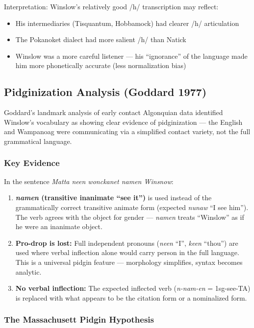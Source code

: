 Interpretation: Winslow's relatively good /h/ transcription may reflect:
\begin{itemize}
  \item His intermediaries (Tisquantum, Hobbamock) had clearer /h/ articulation
  \item The Pokanoket dialect had more salient /h/ than Natick
  \item Winslow was a more careful listener --- his ``ignorance'' of the
    language made him more phonetically accurate (less normalization bias)
\end{itemize}

\subsection{Pidginization Analysis (Goddard 1977)}

Goddard's landmark analysis of early contact Algonquian data identified
Winslow's vocabulary as showing clear evidence of pidginization --- the English
and Wampanoag were communicating via a simplified contact variety, not the full
grammatical language.

\subsubsection{Key Evidence}

In the sentence \emph{Matta neen wonckanet namen Winsnow}:

\begin{enumerate}
  \item \textbf{\emph{namen} (transitive inanimate ``see it'')} is used instead
    of the grammatically correct transitive animate form (expected \emph{nunaw}
    ``I see him''). The verb agrees with the object for gender --- \emph{namen}
    treats ``Winslow'' as if he were an inanimate object.
  \item \textbf{Pro-drop is lost:} Full independent pronouns (\emph{neen} ``I'',
    \emph{keen} ``thou'') are used where verbal inflection alone would carry
    person in the full language. This is a universal pidgin feature ---
    morphology simplifies, syntax becomes analytic.
  \item \textbf{No verbal inflection:} The expected inflected verb
    (\emph{n-nam-en} = 1sg-see-TA) is replaced with what appears to be the
    citation form or a nominalized form.
\end{enumerate}

\subsubsection{The Massachusett Pidgin Hypothesis}

